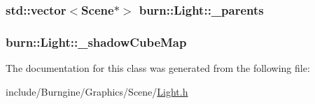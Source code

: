 \hypertarget{classburn_1_1_light_a33188aef471ba7c742c004a787c5a8b4}{
\subsubsection[{\-\_\-parents}]{\setlength{\rightskip}{0pt plus 5cm}std\-::vector$<${\bf Scene}$\ast$$>$ burn\-::\-Light\-::\-\_\-parents\hspace{0.3cm}{\ttfamily [protected]}}}\label{classburn_1_1_light_a33188aef471ba7c742c004a787c5a8b4}
\hypertarget{classburn_1_1_light_af06e39faf3bc51663bc2f0e0302bd0d0}{
\subsubsection[{\-\_\-shadow\-Cube\-Map}]{ burn\-::\-Light\-::\-\_\-shadow\-Cube\-Map\hspace{0.3cm}{\ttfamily [protected]}}}\label{classburn_1_1_light_af06e39faf3bc51663bc2f0e0302bd0d0}


The documentation for this class was generated from the following file\-:\begin{DoxyCompactItemize}
\item 
include/\-Burngine/\-Graphics/\-Scene/\hyperlink{_light_8h}{Light.\-h}\end{DoxyCompactItemize}
